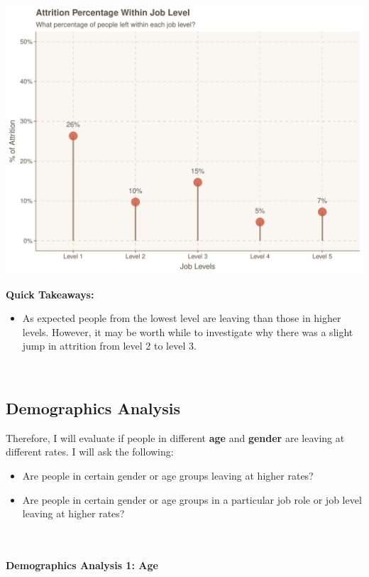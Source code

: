 \documentclass[
]{article}
\providecommand{\tightlist}{%
  \setlength{\itemsep}{0pt}\setlength{\parskip}{0pt}}
\begin{document}
\includegraphics{figures/Attrition Within Job Level-1.pdf}

\textbf{Quick Takeaways:}

\begin{itemize}
\tightlist
\item
  As expected people from the lowest level are leaving than those in
  higher levels. However, it may be worth while to investigate why there
  was a slight jump in attrition from level 2 to level 3.
\end{itemize}

~ ~

\hypertarget{demographics-analysis}{%
\subsection{Demographics Analysis}\label{demographics-analysis}}

Therefore, I will evaluate if people in different \textbf{age} and
\textbf{gender} are leaving at different rates. I will ask the
following:

\begin{itemize}
\tightlist
\item
  Are people in certain gender or age groups leaving at higher rates?
\item
  Are people in certain gender or age groups in a particular job role or
  job level leaving at higher rates?
\end{itemize}

~ ~

\hypertarget{demographics-analysis-1-age}{%
\paragraph{Demographics Analysis 1:
Age}\label{demographics-analysis-1-age}}
\end{document}
